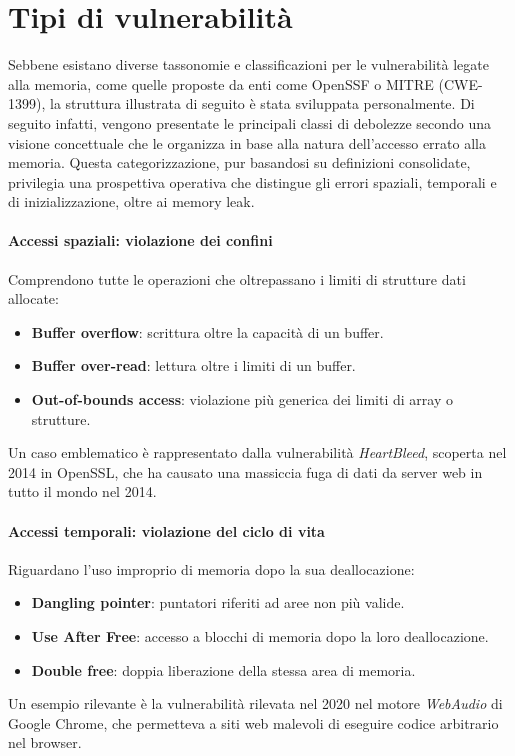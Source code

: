 \section{Tipi di vulnerabilità}
\label{sec:vulnerability_types}

Sebbene esistano diverse tassonomie e classificazioni per le vulnerabilità legate
alla memoria, come quelle proposte da enti come OpenSSF\cite{memory_safety_continuum_definition}
o MITRE (CWE-1399\cite{cwe_1399}), la struttura illustrata di seguito è stata sviluppata
personalmente. Di seguito infatti, vengono presentate le principali classi di debolezze
secondo una visione concettuale che le organizza in base alla natura dell'accesso
errato alla memoria. Questa categorizzazione, pur basandosi su definizioni consolidate,
privilegia una prospettiva operativa che distingue gli errori spaziali, temporali
e di inizializzazione, oltre ai memory leak.

\paragraph{Accessi spaziali: violazione dei confini}
\label{sec:spatial}

Comprendono tutte le operazioni che oltrepassano i limiti di strutture dati
allocate:
\begin{itemize}
  \item \textbf{Buffer overflow}: scrittura oltre la capacità di un buffer.

  \item \textbf{Buffer over-read}: lettura oltre i limiti di un buffer.

  \item \textbf{Out-of-bounds access}: violazione più generica dei limiti di array
    o strutture.
\end{itemize}
Un caso emblematico è rappresentato dalla vulnerabilità \textit{HeartBleed}\cite{heartbleed},
scoperta nel 2014 in OpenSSL, che ha causato una massiccia fuga di dati da server
web in tutto il mondo nel 2014.

\paragraph{Accessi temporali: violazione del ciclo di vita}
\label{sec:temporal}

Riguardano l'uso improprio di memoria dopo la sua deallocazione:
\begin{itemize}
  \item \textbf{Dangling pointer}: puntatori riferiti ad aree non più valide.

  \item \textbf{Use After Free}: accesso a blocchi di memoria dopo la loro deallocazione.

  \item \textbf{Double free}: doppia liberazione della stessa area di memoria.
\end{itemize}
Un esempio rilevante è la vulnerabilità rilevata nel 2020 nel motore \textit{WebAudio}
di Google Chrome\cite{webaudio_uaf}, che permetteva a siti web malevoli di
eseguire codice arbitrario nel browser.

